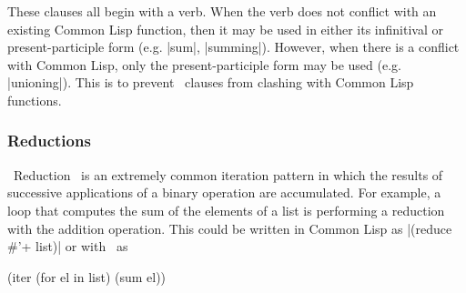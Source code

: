 These clauses all begin with a verb.  When the verb does
not conflict with an existing Common Lisp function, then it may be
used in either its infinitival or present-participle form (e.g. |sum|,
|summing|).  However, when there is a conflict with Common Lisp, only
the present-participle form may be used (e.g. |unioning|).  This is to
prevent \iter\ clauses from clashing with Common Lisp
functions. 


\subsubsection{Reductions}

~Reduction~ is an extremely common iteration pattern in which
the results of successive applications of a
binary operation are accumulated.
For example, a loop that computes the sum of the
elements of a list is performing a reduction with the addition
operation.  This could be written in Common Lisp as  |(reduce \#'+
list)| or with \iter\ as
\begin{program}
(iter (for el in list)
      (sum el))
\end{program}

